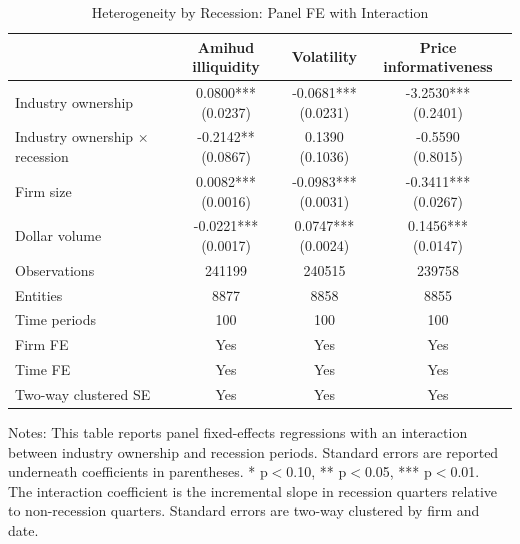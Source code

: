 \begin{table}[!htbp]\centering
\caption{Heterogeneity by Recession: Panel FE with Interaction}
\label{tab:recession_interaction_detailed}
\begin{threeparttable}
\footnotesize
\setlength{\tabcolsep}{3.5pt}
\renewcommand{\arraystretch}{1.05}
\begin{tabular}{lccc}
\toprule
 & Amihud illiquidity & Volatility & Price informativeness \\
\midrule
Industry ownership & \shortstack{0.0800***\\(0.0237)} & \shortstack{-0.0681***\\(0.0231)} & \shortstack{-3.2530***\\(0.2401)} \\
Industry ownership $\times$ recession & \shortstack{-0.2142**\\(0.0867)} & \shortstack{0.1390\\(0.1036)} & \shortstack{-0.5590\\(0.8015)} \\
Firm size & \shortstack{0.0082***\\(0.0016)} & \shortstack{-0.0983***\\(0.0031)} & \shortstack{-0.3411***\\(0.0267)} \\
Dollar volume & \shortstack{-0.0221***\\(0.0017)} & \shortstack{0.0747***\\(0.0024)} & \shortstack{0.1456***\\(0.0147)} \\
\midrule
Observations & 241199 & 240515 & 239758 \\
Entities & 8877 & 8858 & 8855 \\
Time periods & 100 & 100 & 100 \\
Firm FE & Yes & Yes & Yes \\
Time FE & Yes & Yes & Yes \\
Two-way clustered SE & Yes & Yes & Yes \\
\bottomrule
\end{tabular}
\vspace{0.35em}
\noindent\parbox{\textwidth}{\footnotesize
Notes: This table reports panel fixed-effects regressions with an interaction between industry ownership and recession periods. Standard errors are reported underneath coefficients in parentheses. * p$<$0.10, ** p$<$0.05, *** p$<$0.01.\\
The interaction coefficient is the incremental slope in recession quarters relative to non-recession quarters. Standard errors are two-way clustered by firm and date.
}
\end{threeparttable}
\end{table}
